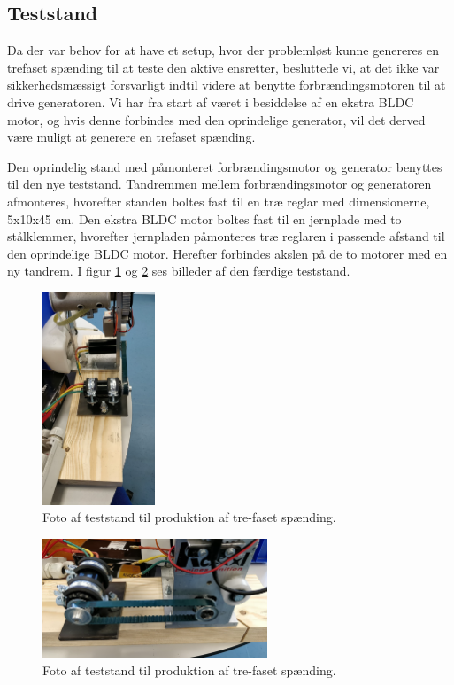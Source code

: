 \subsection{Teststand}
\label{sec:teststand}

Da der var behov for at have et setup, hvor der problemløst kunne genereres en trefaset spænding til at teste den aktive ensretter, besluttede vi, at det ikke var sikkerhedsmæssigt forsvarligt indtil videre at benytte forbrændingsmotoren til at drive generatoren. Vi har fra start af været i besiddelse af en ekstra BLDC motor, og hvis denne forbindes med den oprindelige generator, vil det derved være muligt at generere en trefaset spænding.

Den oprindelig stand med påmonteret forbrændingsmotor og generator benyttes til den nye teststand. Tandremmen mellem forbrændingsmotor og generatoren afmonteres, hvorefter standen boltes fast til en træ reglar med dimensionerne, 5x10x45 cm. Den ekstra BLDC motor boltes fast til en jernplade med to stålklemmer, hvorefter jernpladen påmonteres træ reglaren i passende afstand til den oprindelige BLDC motor. Herefter forbindes akslen på de to motorer med en ny tandrem. I figur \ref{fig:nt1} og \ref{fig:nt2} ses billeder af den færdige teststand.
\clearpage
\begin{figure}[h]
  \centering
  \includegraphics[width=0.3\textwidth]{./figurer/nt1.png}
  \caption{Foto af teststand til produktion af tre-faset spænding.}
  \label{fig:nt1}
\end{figure}

\begin{figure}[h]
  \centering
  \includegraphics[width=0.6\textwidth]{./figurer/nt2.png}
  \caption{Foto af teststand til produktion af tre-faset spænding.}
  \label{fig:nt2}
\end{figure}

